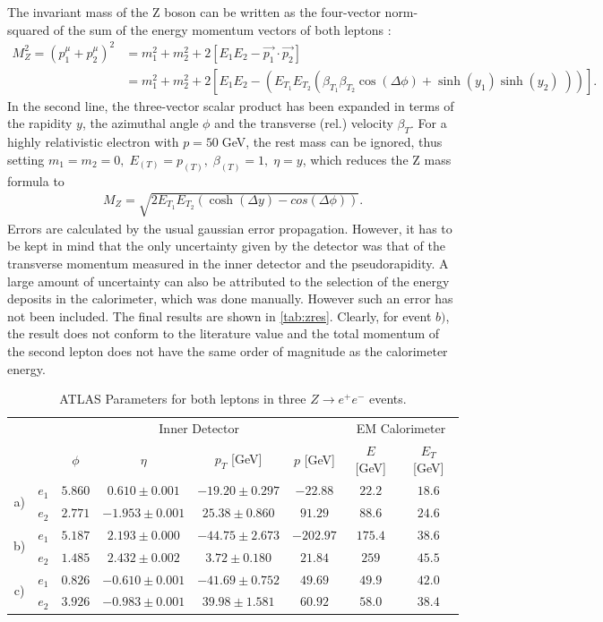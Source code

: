 \documentclass[twoside,        %
               BCOR12mm,       %
               ngerman,english, %
               fleqn,headsepline=false,footsepline=false
              ]{Vorlage/MFPREPORT}
\begin{document}
The invariant mass of the Z boson can be written as the four-vector
norm-squared of the sum of the energy momentum vectors of both leptons \cite{kinematics}:
\begin{align}
    M_Z^2=(p_1^\mu+p_2^\mu)^2&=m_1^2+m_2^2+2[E_1
    E_2-\vec{p_1}\cdot\vec{p_2}]\\&=m_1^2+m_2^2+2[E_1
    E_2-(E_{T_1}E_{T_2}(\beta_{T_1}\beta_{T_2}\cos(\Delta\phi)+\sinh(y_1)\sinh(y_2)\;))].
\end{align}
In the second line, the three-vector scalar product has been expanded in terms
of the rapidity $y$, the azimuthal angle $\phi$ and the transverse (rel.)
velocity $\beta_T$. For a highly relativistic electron with $p=50\;$GeV, the rest mass can be
ignored, thus setting $m_1=m_2=0,\;E_{(T)}=p_{(T)},\;\beta_{(T)}=1,\;\eta=y$,
which reduces the Z mass formula to
\begin{align}
    \label{eq:zmass}
    M_Z=\sqrt{2E_{T_1}E_{T_2}(\cosh(\Delta y)-cos(\Delta\phi))}.
\end{align}
Errors are calculated by the usual gaussian error propagation. However, it has
to be kept in mind that the only uncertainty given by the detector was that of
the transverse momentum measured in the inner detector and the pseudorapidity.
A large amount of uncertainty can also be attributed to the selection of the
energy deposits in the calorimeter, which was done manually. However such an
error has not been included.
The final results are shown in \cref{tab:zres}. Clearly, for event $b)$, the
result does not conform to the literature value and the total momentum of the
second lepton does not have the same order of magnitude as the calorimeter
energy.
\begin{table}
\centering
\begin{tabular}{|c c|c|c|c|c|c|c|}
\hline
& & \multicolumn{4}{c|}{Inner Detector}&\multicolumn{2}{c|}{EM
Calorimeter}\\
& &$\phi$&$\eta$&$p_T$ [GeV]&$p$ [GeV]&$E$ [GeV]&$E_T$
[GeV]\\
\hline
\multirow{2}{*}{a)}&$e_1$&$5.860$&$0.610\pm
0.001$&$-19.20\pm 0.297$&$-22.88$&$22.2$&$18.6$\\
&$e_2$&$2.771$&$-1.953\pm 0.001$&$25.38\pm
0.860$&$91.29$&$88.6$&$24.6$\\
\hline
\multirow{2}{*}{b)}&$e_1$&$5.187$&$2.193\pm
0.000$&$-44.75\pm 2.673$&$-202.97$&$175.4$&$38.6$\\
&$e_2$&$1.485$&$2.432\pm 0.002$&$3.72\pm
0.180$&$21.84$&$259$&$45.5$\\
\hline
\multirow{2}{*}{c)}&$e_1$&$0.826$&$-0.610\pm
0.001$&$-41.69\pm
0.752$&$49.69$&$49.9$&$42.0$\\
&$e_2$&$3.926$&$-0.983\pm 0.001$&$39.98\pm
1.581$&$60.92$&$58.0$&$38.4$\\
\hline
\end{tabular}
\caption{ATLAS Parameters for both
leptons in three $Z\rightarrow e^+
e^-$ events.}
\label{tab:zrec}
\end{table}
\end{document}
